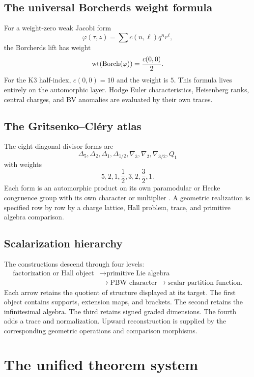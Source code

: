 \chapter{The universal Borcherds weight formula}
For a weight-zero weak Jacobi form
\[
 \varphi(\tau,z)=\sum c(n,\ell)q^nr^\ell,
\]
the Borcherds lift has weight
\[
 \operatorname{wt}(\operatorname{Borch}(\varphi))=\frac{c(0,0)}2.
\]
For the K3 half-index, $c(0,0)=10$ and the weight is $5$. This formula lives entirely on the automorphic layer. Hodge Euler characteristics, Heisenberg ranks, central charges, and BV anomalies are evaluated by their own traces.

\chapter{The Gritsenko--Cl\'ery atlas}
The eight diagonal-divisor forms are
\[
 \Delta_5,\Delta_2,\Delta_1,\Delta_{1/2},
 \nabla_3,\nabla_2,\nabla_{3/2},Q_1
\]
with weights
\[
 5,2,1,\frac12,3,2,\frac32,1.
\]
Each form is an automorphic product on its own paramodular or Hecke congruence group with its own character or multiplier \cite{GC}. A geometric realization is specified row by row by a charge lattice, Hall problem, trace, and primitive algebra comparison.

\chapter{Scalarization hierarchy}
The constructions descend through four levels:
\[
\begin{aligned}
 \text{factorization or Hall object}
 &\longrightarrow \text{primitive Lie algebra}\\
 &\longrightarrow \text{PBW character}
 \longrightarrow \text{scalar partition function}.
\end{aligned}
\]
Each arrow retains the quotient of structure displayed at its target. The first object contains supports, extension maps, and brackets. The second retains the infinitesimal algebra. The third retains signed graded dimensions. The fourth adds a trace and normalization. Upward reconstruction is supplied by the corresponding geometric operations and comparison morphisms.

\part{The unified theorem system}

